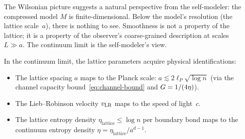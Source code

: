 The Wilsonian picture suggests a natural perspective from the
self-modeler:  the compressed model $M$ is finite-dimensional.  Below
the model's resolution (the lattice scale~$a$), there is nothing to
see.  Smoothness is not a property of the lattice; it is a property of
the observer's coarse-grained description at scales $L \gg a$.  The
continuum limit is the self-modeler's view.

In the continuum limit, the lattice parameters acquire physical
identifications:
\begin{itemize}
\item The lattice spacing $a$ maps to the Planck scale:
  $a \lesssim 2\ell_P \sqrt{\log n}$ (via the channel capacity
  bound~\eqref{eq:channel-bound} and
  $G = 1/(4\eta)$).
\item The Lieb--Robinson velocity $v_{\mathrm{LR}}$ maps to the speed of
  light~$c$.
\item The lattice entropy density
  $\eta_{\mathrm{lattice}} \leq \log n$ per boundary bond maps to
  the continuum entropy density
  $\eta = \eta_{\mathrm{lattice}}/a^{d-1}$.
\end{itemize}
